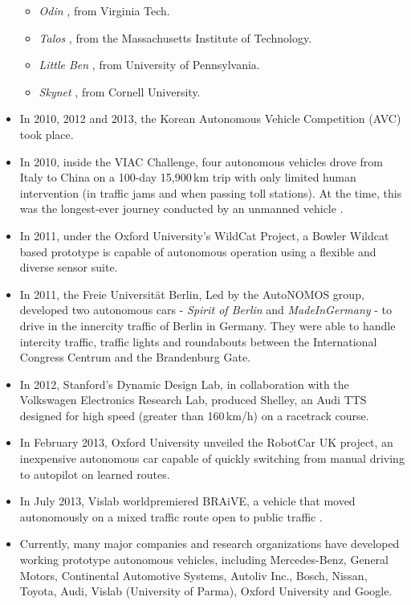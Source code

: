 \begin{itemize}
\begin{itemize}
  \item \emph{Odin} \citep{Bacha2008}, from Virginia Tech.
  \item \emph{Talos} \citep{leonard2007team}, from the Massachusetts Institute of Technology.
  \item \emph{Little Ben} \citep{bohren2008little}, from University of Pennsylvania.
  \item \emph{Skynet} \citep{miller2008team}, from Cornell University.
 \end{itemize}
 \item In 2010, 2012 and 2013, the Korean Autonomous Vehicle Competition (AVC) took place.
 \item In 2010, inside the VIAC Challenge, four autonomous vehicles drove from Italy to China on a 100-day 15,900\,km trip with only limited human intervention (in traffic jams and when passing toll stations). At the time, this was the longest-ever journey conducted by an unmanned vehicle \citep{Broggi2010VIAC}.
 \item In 2011, under the Oxford University's WildCat Project, a Bowler Wildcat based prototype is capable of autonomous operation using a flexible and diverse sensor suite.
 \item In 2011, the Freie Universität Berlin, Led by the AutoNOMOS group, developed two autonomous cars - \emph{Spirit of Berlin} \citep{berlin2007spirit} and \emph{MadeInGermany} \citep{gohring2013semi} - to drive in the innercity traffic of Berlin in Germany. They were able to handle intercity traffic, traffic lights and roundabouts between the International Congress Centrum and the Brandenburg Gate.
 \item In 2012, Stanford's Dynamic Design Lab, in collaboration with the Volkswagen Electronics Research Lab, produced Shelley, an Audi TTS designed for high speed (greater than 160\,km/h) on a racetrack course.
 \item In February 2013, Oxford University unveiled the RobotCar UK project, an inexpensive autonomous car capable of quickly switching from manual driving to autopilot on learned routes.
 \item In July 2013, Vislab worldpremiered BRAiVE, a vehicle that moved autonomously on a mixed traffic route open to public traffic \citep{grisleri2010braive}.
 \item Currently, many major companies and research organizations have developed working prototype autonomous vehicles, including Mercedes-Benz, General Motors, Continental Automotive Systems, Autoliv Inc., Bosch, Nissan, Toyota, Audi, Vislab (University of Parma), Oxford University and Google.
\end{itemize}
 
